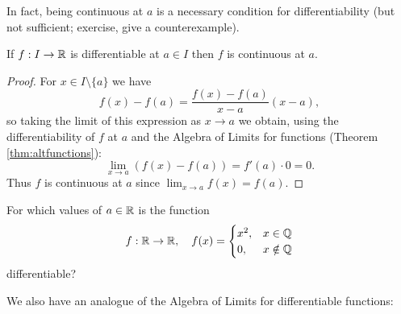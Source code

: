 \documentclass[../analysis1.tex]{subfiles}
\begin{document}
In fact, being continuous at $a$ is a necessary condition for differentiability (but not sufficient; exercise, give a counterexample).

\begin{theorem}
\label{thm:diffimplycont}
    \begin{shaded*}
        If $f:I\to\mathbb{R}$ is differentiable at $a\in I$ then $f$ is continuous at $a$.
    \end{shaded*}
\end{theorem}
\begin{proof}
    For $x\in I\setminus\{a\}$ we have
    \[f(x)-f(a)=\frac{f(x)-f(a)}{x-a}(x-a),\]
    so taking the limit of this expression as $x\to a$ we obtain, using the differentiability of $f$ at $a$ and the Algebra of Limits for functions (Theorem \ref{thm:altfunctions}):
    \[\lim _{x\to a}\left(f(x)-f(a)\right)=f'(a)\cdot 0 = 0.\]
    Thus $f$ is continuous at $a$ since $\lim_{x\to a}f(x)=f(a)$.\qedhere
\end{proof}
\begin{exercise*}
    For which values of $a\in\mathbb{R}$ is the function
    \[f:\mathbb{R}\to\mathbb{R},\quad f(x)=\begin{cases}
        x^2, & x\in\mathbb{Q}\\
        0, & x\notin \mathbb{Q}
    \end{cases}\]
    differentiable?
\end{exercise*}
We also have an analogue of the Algebra of Limits for differentiable functions:
\end{document}
